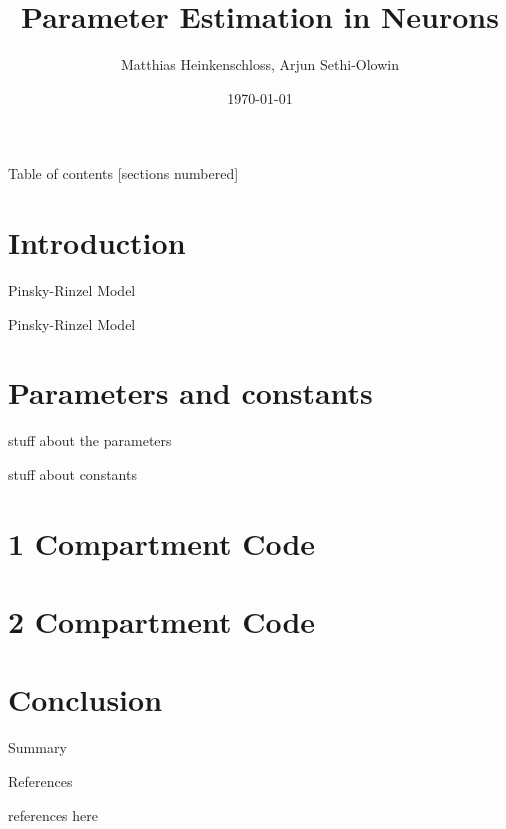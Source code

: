 \documentclass[10pt]{beamer}
\title{Parameter Estimation in Neurons}
\date{\today}
\author{Matthias Heinkenschloss, Arjun Sethi-Olowin}
\institute{Rice University}
\begin{document}
\maketitle

\begin{frame}{Table of contents}
  [sections numbered]
  \tableofcontents%
\end{frame}

\section[Intro]{Introduction}

\begin{frame}[fragile]{Pinsky-Rinzel Model}

    Pinsky-Rinzel Model
  
\end{frame}

\section{Parameters and constants}

\begin{frame}{stuff about the parameters}
	
\end{frame}

\begin{frame}{stuff about constants}
    
\end{frame}

\section{1 Compartment Code}

\section{2 Compartment Code}

\section{Conclusion}

\begin{frame}{Summary}
    
\end{frame}

\appendix

\begin{frame}{References}

    references here
    
\end{frame}
\end{document}
